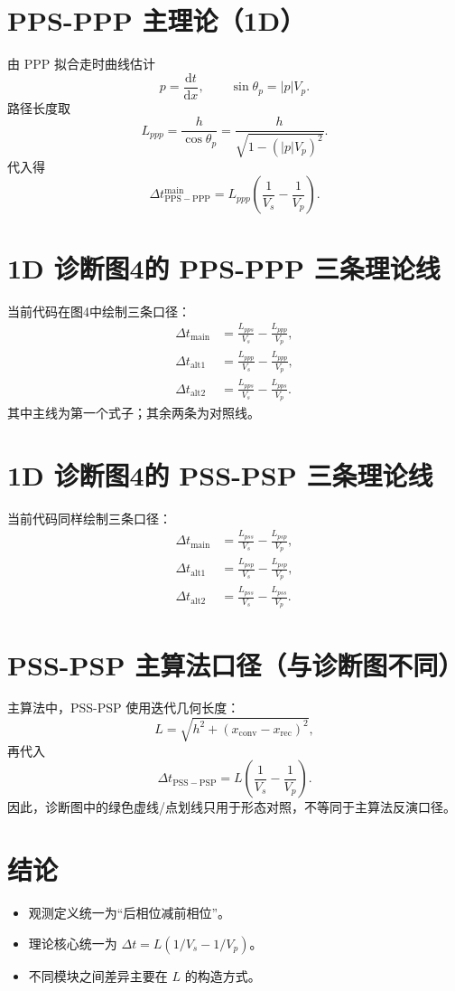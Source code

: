 \documentclass[11pt,a4paper]{article}
\begin{document}
\section{PPS-PPP 主理论（1D）}
由 PPP 拟合走时曲线估计
\begin{equation}
p=\frac{\mathrm{d}t}{\mathrm{d}x}, \qquad
\sin\theta_p = |p|V_p.
\end{equation}
路径长度取
\begin{equation}
L_{ppp}=\frac{h}{\cos\theta_p}
=\frac{h}{\sqrt{1-(|p|V_p)^2}}.
\end{equation}
代入得
\begin{equation}
\Delta t_{\mathrm{PPS-PPP}}^{\mathrm{main}}
=L_{ppp}\left(\frac{1}{V_s}-\frac{1}{V_p}\right).
\end{equation}

\section{1D 诊断图4的 PPS-PPP 三条理论线}
当前代码在图4中绘制三条口径：
\begin{align}
\Delta t_{\mathrm{main}} &= \frac{L_{pps}}{V_s} - \frac{L_{ppp}}{V_p}, \\
\Delta t_{\mathrm{alt1}} &= \frac{L_{ppp}}{V_s} - \frac{L_{ppp}}{V_p}, \\
\Delta t_{\mathrm{alt2}} &= \frac{L_{pps}}{V_s} - \frac{L_{pps}}{V_p}.
\end{align}
其中主线为第一个式子；其余两条为对照线。

\section{1D 诊断图4的 PSS-PSP 三条理论线}
当前代码同样绘制三条口径：
\begin{align}
\Delta t_{\mathrm{main}} &= \frac{L_{pss}}{V_s} - \frac{L_{psp}}{V_p}, \\
\Delta t_{\mathrm{alt1}} &= \frac{L_{psp}}{V_s} - \frac{L_{psp}}{V_p}, \\
\Delta t_{\mathrm{alt2}} &= \frac{L_{pss}}{V_s} - \frac{L_{pss}}{V_p}.
\end{align}

\section{PSS-PSP 主算法口径（与诊断图不同）}
主算法中，PSS-PSP 使用迭代几何长度：
\begin{equation}
L=\sqrt{h^2+\left(x_{\mathrm{conv}}-x_{\mathrm{rec}}\right)^2},
\end{equation}
再代入
\begin{equation}
\Delta t_{\mathrm{PSS-PSP}} =
L\left(\frac{1}{V_s}-\frac{1}{V_p}\right).
\end{equation}
因此，诊断图中的绿色虚线/点划线只用于形态对照，不等同于主算法反演口径。

\section{结论}
\begin{itemize}
\item 观测定义统一为“后相位减前相位”。
\item 理论核心统一为 $\Delta t=L(1/V_s-1/V_p)$。
\item 不同模块之间差异主要在 $L$ 的构造方式。
\end{itemize}
\end{document}
